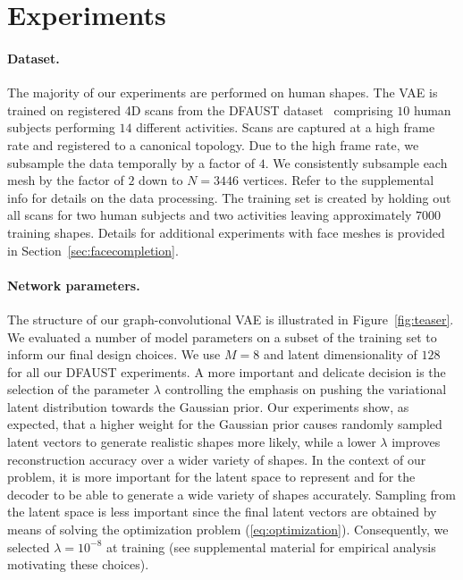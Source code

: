 \documentclass[10pt,twocolumn,letterpaper]{article}
\begin{document}
\section{Experiments}\paragraph{Dataset.} 
The majority of our experiments are performed on human shapes. The VAE is trained on registered 4D scans from the DFAUST dataset~\cite{dfaust:CVPR:2017} comprising $10$ human subjects performing $14$ different activities. Scans are captured at a high frame rate and registered to a canonical topology. Due to the high frame rate, we subsample the data temporally by a factor of $4$. We consistently subsample each mesh by the factor of $2$ down to $N=3446$ vertices. Refer to the supplemental info for details on the data processing. The training set is created by holding out all scans for two human subjects and two activities leaving approximately $7000$ training shapes. Details for additional experiments with face meshes is provided in Section~\ref{sec:facecompletion}.

\paragraph{Network parameters.} 
The structure of our graph-convolutional VAE is illustrated in Figure~\ref{fig:teaser}. We evaluated a number of model parameters on a subset of the training set to inform our final design choices. We use $M=8$ and latent dimensionality of $128$ for all our DFAUST experiments.  
A more important and delicate decision is the selection of the parameter $\lambda$ controlling the emphasis on pushing the variational latent distribution towards the Gaussian prior. Our experiments show, as expected, that a higher weight for the Gaussian prior causes randomly sampled latent vectors to generate realistic shapes more likely, while a lower $\lambda$ improves reconstruction accuracy over a wider variety of shapes. In the context of our problem, it is more important for the latent space to represent and for the decoder to be able to generate a wide variety of shapes accurately. Sampling from the latent space is less important since the final latent vectors are obtained by means of solving the optimization problem (\ref{eq:optimization}). Consequently, we selected $\lambda = 10^{-8}$ at training (see supplemental material for empirical analysis motivating these choices).
\end{document}
